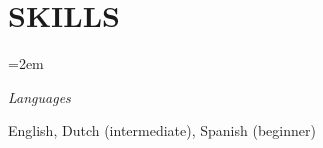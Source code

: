 \documentclass[paper=a4,fontsize=11pt]{scrartcl} %
\newlength{\spacebox}
\newcommand{\sepspace}{\vspace*{1em}}     %
\newcommand{\NewPart}[1]{\section*{\uppercase{#1}}}
\newcommand{\PersonalEntry}[2]{
    \noindent\hangindent=2em\hangafter=0  %
    \parbox{\spacebox}{                   %
    \textit{#1}}                          %
    \hspace{1.5em} #2 \par}               %
\newcommand{\SkillsEntry}[2]{             %
    \noindent\hangindent=2em\hangafter=0  %
    \parbox{\spacebox}{                   %
    \textit{#1}}                          %
    \hspace{1.5em} #2 \par}               %
\begin{document}

\NewPart{Skills}{}

\SkillsEntry{Languages}{English, Dutch (intermediate), Spanish (beginner)}

\end{document}
